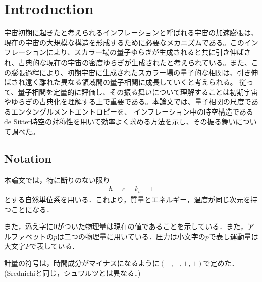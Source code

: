 \chapter{Introduction}
宇宙初期に起きたと考えられるインフレーションと呼ばれる宇宙の加速膨張は、現在の宇宙の大規模な構造を形成するために必要なメカニズムである。このインフレーションにより、スカラー場の量子ゆらぎが生成されると共に引き伸ばされ、古典的な現在の宇宙の密度ゆらぎが生成されたと考えられている。また、この膨張過程により、初期宇宙に生成されたスカラー場の量子的な相関は、引き伸ばされ遠く離れた異なる領域間の量子相関に成長していくと考えられる。
  従って、量子相関を定量的に評価し、その振る舞いについて理解することは初期宇宙やゆらぎの古典化を理解する上で重要である。本論文では、量子相関の尺度であるエンタングルメントエントロピーを、 インフレーション中の時空構造であるde Sitter時空の対称性を用いて効率よく求める方法を示し、その振る舞いについて調べた。


\section*{Notation}
本論文では，特に断りのない限り\begin{eqnarray}
\hbar=c=k_{b}=1
\end{eqnarray}
とする自然単位系を用いる．これより，質量とエネルギー，温度が同じ次元を持つことになる．

また，添え字に0がついた物理量は現在の値であることを示している．また，アルファベットの$p$は二つの物理量に用いている．圧力は小文字の$p$で表し運動量は大文字$P$で表している．

計量の符号は，時間成分がマイナスになるように$(-,+,+,+)$で定めた．(Srednichiと同じ，シュワルツとは異なる．)

